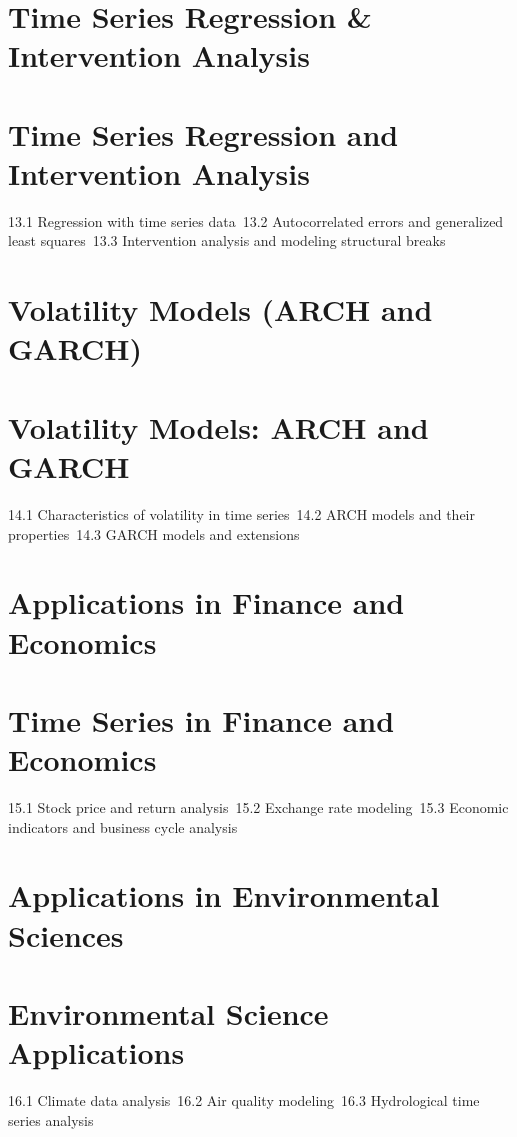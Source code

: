 \section{Time Series Regression \& Intervention Analysis}
\section{Time Series Regression and Intervention Analysis}
13.1 Regression with time series data\
13.2 Autocorrelated errors and generalized least squares\
13.3 Intervention analysis and modeling structural breaks\
\section{Volatility Models (ARCH and GARCH)}
\section{Volatility Models: ARCH and GARCH}
14.1 Characteristics of volatility in time series\
14.2 ARCH models and their properties\
14.3 GARCH models and extensions\
\section{Applications in Finance and Economics}
\section{Time Series in Finance and Economics}
15.1 Stock price and return analysis\
15.2 Exchange rate modeling\
15.3 Economic indicators and business cycle analysis\
\section{Applications in Environmental Sciences}
\section{Environmental Science Applications}
16.1 Climate data analysis\
16.2 Air quality modeling\
16.3 Hydrological time series analysis\
